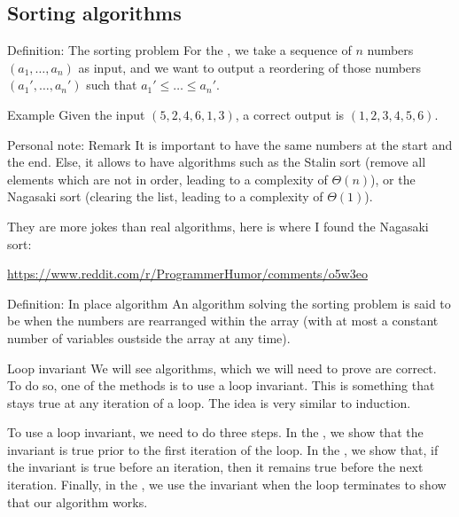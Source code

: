 \documentclass[a4paper]{article}
\begin{document}
\subsection{Sorting algorithms}
\begin{parag}{Definition: The sorting problem}
    For the , we take a sequence of $n$ numbers $\left(a_1, \ldots, a_n\right)$ as input, and we want to output a reordering of those numbers $\left(a_1', \ldots, a_n'\right)$ such that $a_1' \leq \ldots \leq a_n'$.

    \begin{subparag}{Example}
        Given the input $\left(5, 2, 4, 6, 1, 3\right)$, a correct output is $\left(1, 2, 3, 4, 5, 6\right)$.
    \end{subparag}
    

    \begin{subparag}{Personal note: Remark}
        It is important to have the same numbers at the start and the end. Else, it allows to have algorithms such as the Stalin sort (remove all elements which are not in order, leading to a complexity of $\Theta\left(n\right)$), or the Nagasaki sort (clearing the list, leading to a complexity of $\Theta\left(1\right)$).

        They are more jokes than real algorithms, here is where I found the Nagasaki sort:
        \begin{center}
            \small \url{https://www.reddit.com/r/ProgrammerHumor/comments/o5w3eo}
        \end{center}
        
    \end{subparag}
\end{parag}

\begin{parag}{Definition: In place algorithm}
    An algorithm solving the sorting problem is said to be  when the numbers are rearranged within the array (with at most a constant number of variables oustside the array at any time).
\end{parag}


\begin{parag}{Loop invariant}
    We will see algorithms, which we will need to prove are correct. To do so, one of the methods is to use a loop invariant. This is something that stays true at any iteration of a loop. The idea is very similar to induction.

    To use a loop invariant, we need to do three steps. In the , we show that the invariant is true prior to the first iteration of the loop. In the , we show that, if the invariant is true before an iteration, then it remains true before the next iteration. Finally, in the , we use the invariant when the loop terminates to show that our algorithm works.
\end{parag}
\end{document}
